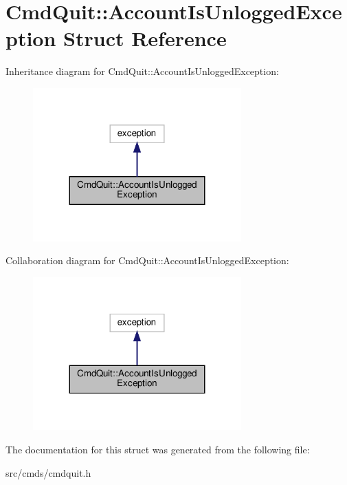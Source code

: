 \hypertarget{structCmdQuit_1_1AccountIsUnloggedException}{}\section{Cmd\+Quit\+:\+:Account\+Is\+Unlogged\+Exception Struct Reference}
\label{structCmdQuit_1_1AccountIsUnloggedException}


Inheritance diagram for Cmd\+Quit\+:\+:Account\+Is\+Unlogged\+Exception\+:
\nopagebreak
\begin{figure}[H]
\begin{center}
\leavevmode
\includegraphics[width=227pt]{structCmdQuit_1_1AccountIsUnloggedException__inherit__graph}
\end{center}
\end{figure}


Collaboration diagram for Cmd\+Quit\+:\+:Account\+Is\+Unlogged\+Exception\+:
\nopagebreak
\begin{figure}[H]
\begin{center}
\leavevmode
\includegraphics[width=227pt]{structCmdQuit_1_1AccountIsUnloggedException__coll__graph}
\end{center}
\end{figure}


The documentation for this struct was generated from the following file\+:\begin{DoxyCompactItemize}
\item 
src/cmds/cmdquit.\+h\end{DoxyCompactItemize}
